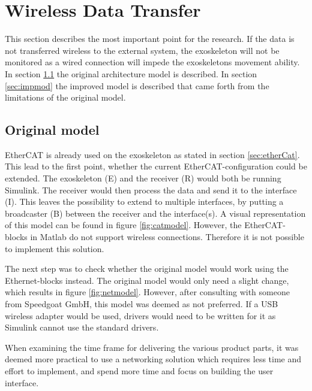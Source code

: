 \section{Wireless Data Transfer}\label{sec:datatrans}
This section describes the most important point for the research. If the data is not transferred wireless to the external system, the exoskeleton will not be monitored as a wired connection will impede the exoskeletons movement ability. In section \ref{sec:orgmod} the original architecture model is described. In section \ref{sec:impmod} the improved model is described that came forth from the limitations of the original model.

\subsection{Original model} \label{sec:orgmod}
EtherCAT is already used on the exoskeleton as stated in section \ref{sec:etherCat}. This lead to the first point, whether the current EtherCAT-configuration could be extended. The exoskeleton (E) and the receiver (R) would both be running Simulink. The receiver would then process the data and send it to the interface (I). This leaves the possibility to  extend to multiple interfaces, by putting a broadcaster (B) between the receiver and the interface(s). A visual representation of this model can be found in figure \ref{fig:catmodel}. However, the EtherCAT-blocks in Matlab \cite{web:ethercat} do not support wireless connections. Therefore it is not possible to implement this solution.

The next step was to check whether the original model would work using the Ethernet-blocks \cite{web:ethernet} instead. The original model would only need a slight change, which results in figure \ref{fig:netmodel}. However, after consulting with someone from Speedgoat GmbH, this model was deemed as not preferred. If a USB wireless adapter would be used, drivers would need to be written for it as Simulink cannot use the standard drivers.

When examining the time frame for delivering the various product parts, it was deemed more practical to use a networking solution which requires less time and effort to implement, and spend more time and focus on building the user interface.

